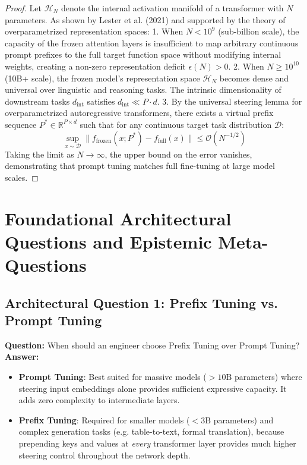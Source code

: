 \documentclass[11pt,a4paper]{article}
\theoremstyle{definition}
\begin{document}
\begin{proof}
Let $\mathcal{H}_N$ denote the internal activation manifold of a transformer with $N$ parameters.
As shown by Lester et al. (2021) and supported by the theory of overparametrized representation spaces:
1. When $N < 10^9$ (sub-billion scale), the capacity of the frozen attention layers is insufficient to map arbitrary continuous prompt prefixes to the full target function space without modifying internal weights, creating a non-zero representation deficit $\epsilon(N) > 0$.
2. When $N \ge 10^{10}$ (10B+ scale), the frozen model's representation space $\mathcal{H}_N$ becomes dense and universal over linguistic and reasoning tasks. The intrinsic dimensionality of downstream tasks $d_{\text{int}}$ satisfies $d_{\text{int}} \ll P \cdot d$.
3. By the universal steering lemma for overparametrized autoregressive transformers, there exists a virtual prefix sequence $P^* \in \mathbb{R}^{P \times d}$ such that for any continuous target task distribution $\mathcal{D}$:
{\boldmath
\begin{equation}
\sup_{x \sim \mathcal{D}} \|f_{\text{frozen}}(x; P^*) - f_{\text{full}}(x)\| \le \mathcal{O}(N^{-1/2})
\end{equation}
}
Taking the limit as $N \to \infty$, the upper bound on the error vanishes, demonstrating that prompt tuning matches full fine-tuning at large model scales.
\end{proof}

\section{Foundational Architectural Questions and Epistemic Meta-Questions}

\subsection{Architectural Question 1: Prefix Tuning vs. Prompt Tuning}
\textbf{Question:} When should an engineer choose Prefix Tuning over Prompt Tuning?\\
\textbf{Answer:} 
\begin{itemize}
    \item \textbf{Prompt Tuning}: Best suited for massive models ($>10\text{B}$ parameters) where steering input embeddings alone provides sufficient expressive capacity. It adds zero complexity to intermediate layers.
    \item \textbf{Prefix Tuning}: Required for smaller models ($<3\text{B}$ parameters) and complex generation tasks (e.g. table-to-text, formal translation), because prepending keys and values at \emph{every} transformer layer provides much higher steering control throughout the network depth.
\end{itemize}
\end{document}
